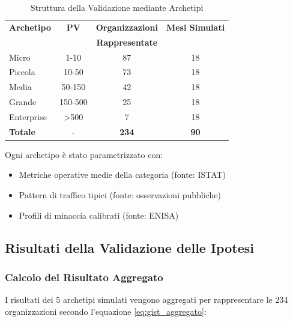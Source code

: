 \begin{table}[h!]
\centering
\caption{Struttura della Validazione mediante Archetipi}
\small
\begin{tabularx}{\textwidth}{|X|c|c|c|}
\hline
\textbf{Archetipo} & \textbf{PV} & \textbf{Organizzazioni} & \textbf{Mesi Simulati} \\
                   &             & \textbf{Rappresentate} & \\
\hline
Micro & 1-10 & 87 & 18 \\
Piccola & 10-50 & 73 & 18 \\
Media & 50-150 & 42 & 18 \\
Grande & 150-500 & 25 & 18 \\
Enterprise & >500 & 7 & 18 \\
\hline
\textbf{Totale} & - & \textbf{234} & \textbf{90} \\
\hline
\end{tabularx}
\end{table}

Ogni archetipo è stato parametrizzato con:
\begin{itemize}
\item Metriche operative medie della categoria (fonte: ISTAT)
\item Pattern di traffico tipici (fonte: osservazioni pubbliche)
\item Profili di minaccia calibrati (fonte: ENISA)
\end{itemize}

\subsection{\texorpdfstring{Risultati della Validazione delle Ipotesi}{5.2.2 - Risultati della Validazione delle Ipotesi}}
\label{subsec:5.2.2}

\subsubsection{Calcolo del Risultato Aggregato}

I risultati dei 5 archetipi simulati vengono aggregati per rappresentare le 234 organizzazioni secondo l'equazione \ref{eq:gist_aggregato}:

